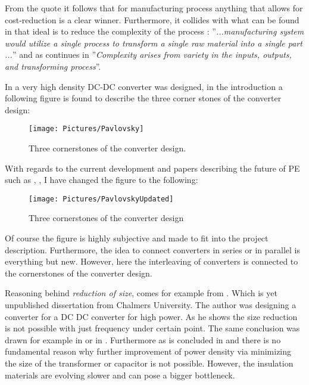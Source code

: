 \documentclass[]{scrartcl}
\begin{document}
From the quote it follows that for manufacturing process anything that allows for cost-reduction is a clear winner. Furthermore, it collides with what can be found in \cite{Ulrich2004} that ideal is to reduce the complexity of the process  : ''\emph{...manufacturing system would utilize a single process to transform a single raw material into a single part ...}'' and as continues in \cite{Ulrich2004} ''\emph{Complexity arises from variety in the inputs, outputs, and transforming process}''.

In \cite{Pavlovsky2006} a very high density DC-DC converter was designed, in the introduction a following figure is found to describe the three corner stones of the converter design:
\begin{figure}[h!]
	\centering
	\texttt{[image: Pictures/Pavlovsky]}
	\caption{Three cornerstones of the converter design. \cite{Pavlovsky2006}}
	\label{fig:pavlovsky}
\end{figure}

With regards to the current development and papers describing the future of PE such as \cite{VanWyk2013}, \cite{Kolar2014a},\cite{Boroyevich2015} I have changed the figure to the following: 

\begin{figure}[h!]
	\centering
	\texttt{[image: Pictures/PavlovskyUpdated]}
	\caption{Three cornerstones of the converter design}
	\label{fig:pavlovskyupdated}
\end{figure}

\newpage
Of course the figure is highly subjective and made to fit into the project description. Furthermore, the idea to connect converters in series or in parallel is everything but new. However, here the interleaving of converters is connected to the cornerstones of the converter design. 

Reasoning behind \emph{reduction of size}, comes for example from \cite{Bahmani2016}. Which is yet unpublished dissertation from Chalmers University. The author was designing a converter for a DC DC converter for high power. As he shows the size reduction is not possible with just frequency under certain point. The same conclusion was drawn for example in \cite{Fan2011} or in \cite{Yang2015a}. Furthermore as is concluded in \cite{Hanson2016} and \cite{Kyaw2015} there is no fundamental reason why further improvement of power density via minimizing the size of the transformer  or capacitor is not possible. However, the insulation materials are evolving slower and can pose a bigger bottleneck.
\end{document}
